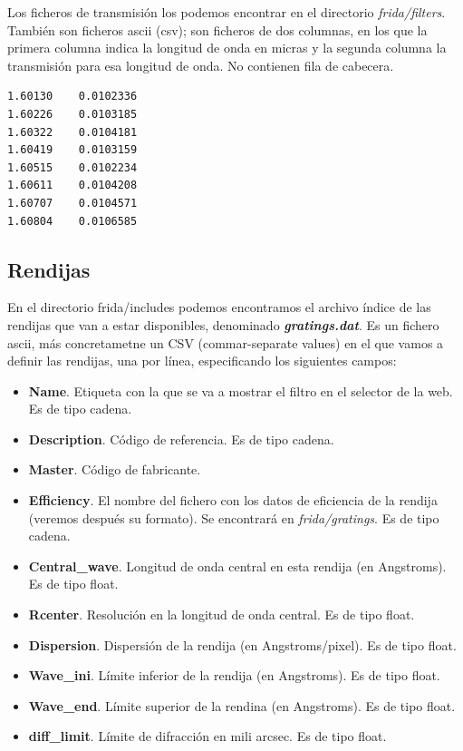     Los ficheros de transmisi\'on los podemos encontrar en el directorio \textit{frida/filters}. Tambi\'en son ficheros ascii (csv); son ficheros de dos columnas, en los que la primera columna indica la longitud de onda en micras y la segunda columna la transmisi\'on para esa longitud de onda. No contienen fila de cabecera.
\begin{Verbatim}[fontsize=\scriptsize]
1.60130    0.0102336
1.60226    0.0103185
1.60322    0.0104181
1.60419    0.0103159
1.60515    0.0102234
1.60611    0.0104208
1.60707    0.0104571
1.60804    0.0106585
\end{Verbatim}

    \subsection{Rendijas}
    En el directorio frida/includes podemos encontramos el archivo \'indice de las rendijas que van a estar disponibles, denominado \textbf{\textit{gratings.dat}}. Es un fichero ascii, m\'as concretametne un CSV (commar-separate values) en el que vamos a definir las rendijas, una por l\'inea, especificando los siguientes campos:

    \begin{itemize}
        \item \textbf{Name}. Etiqueta con la que se va a mostrar el filtro en el selector de la web. Es de tipo cadena.
        \item \textbf{Description}. C\'odigo de referencia. Es de tipo cadena.
        \item \textbf{Master}. C\'odigo de fabricante.
        \item \textbf{Efficiency}. El nombre del fichero con los datos de eficiencia de la rendija (veremos despu\'es su formato). Se encontrar\'a en \textit{frida/gratings}. Es de tipo cadena.
        \item \textbf{Central\_wave}. Longitud de onda central en esta rendija (en Angstroms). Es de tipo float.
        \item \textbf{Rcenter}. Resolución en la longitud de onda central. Es de tipo float.
        \item \textbf{Dispersion}. Dispersi\'on de la rendija (en Angstroms/pixel). Es de tipo float.
        \item \textbf{Wave\_ini}. L\'imite inferior de la rendija (en Angstroms). Es de tipo float.
        \item \textbf{Wave\_end}. L\'imite superior de la rendina (en Angstroms). Es de tipo float.
        \item \textbf{diff\_limit}. L\'imite de difracci\'on en mili arcsec. Es de tipo float.
    \end{itemize}

